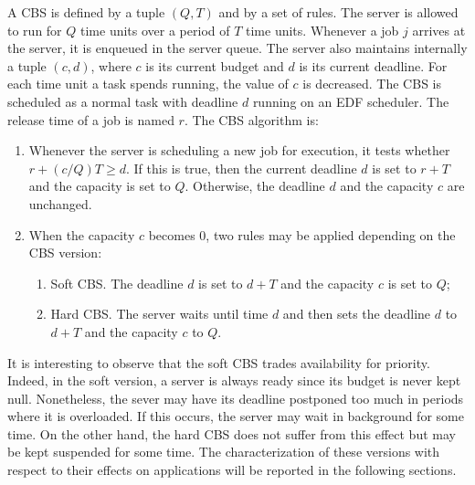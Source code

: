 \documentclass[times, 10pt,twocolumn]{article}
\begin{document}
\label{sec:soft-hard-cbs}

A CBS \cite{abeni.ea98:integrating} is defined by a tuple $(Q,T)$ and
by a set of rules. The server is allowed to run for $Q$ time units
over a period of $T$ time units. Whenever a job $j$ arrives at the
server, it is enqueued in the server queue. The server also maintains
internally a tuple $(c,d)$, where $c$ is its current budget and $d$ is
its current deadline. For each time unit a task spends running, the
value of $c$ is decreased. The CBS is scheduled as a normal task with
deadline $d$ running on an EDF scheduler. The release time of a job is
named $r$. The CBS algorithm is:
\begin{enumerate}
\item Whenever the server is scheduling a new job for execution, it
  tests whether $r + (c/Q)T \geq d$. If this is true, then the current
  deadline $d$ is set to $r+T$ and the capacity is set to
  $Q$. Otherwise, the deadline $d$ and the capacity $c$ are unchanged.
\item When the capacity $c$ becomes $0$, two rules may be applied
  depending on the CBS version:
  \begin{enumerate}
  \item Soft CBS. The deadline $d$ is set to $d+T$
    and the capacity $c$ is set to $Q$;
  \item Hard CBS. The server waits until time $d$ and then sets the
    deadline $d$ to $d+T$ and the capacity $c$ to $Q$.
  \end{enumerate}
\end{enumerate}

It is interesting to observe that the soft CBS trades availability for
priority.  Indeed, in the soft version, a server is always ready since
its budget is never kept null.  Nonetheless, the sever may have its
deadline postponed too much in periods where it is overloaded. If this
occurs, the server may wait in background for some time.  On the other
hand, the hard CBS does not suffer from this effect but may be kept
suspended for some time.  The characterization of these versions with
respect to their effects on applications will be reported in the
following sections.
 
\label{sec:simul-envir}
\end{document}
